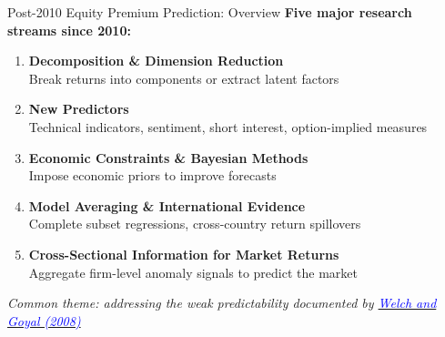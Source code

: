 \documentclass{beamer}
\begin{document}
\begin{frame}{Post-2010 Equity Premium Prediction: Overview}
	\textbf{Five major research streams since 2010:}
	\begin{enumerate}
		\item \textbf{Decomposition \& Dimension Reduction} \\
		      {\small Break returns into components or extract latent factors}
		\item \textbf{New Predictors} \\
		      {\small Technical indicators, sentiment, short interest, option-implied measures}
		\item \textbf{Economic Constraints \& Bayesian Methods} \\
		      {\small Impose economic priors to improve forecasts}
		\item \textbf{Model Averaging \& International Evidence} \\
		      {\small Complete subset regressions, cross-country return spillovers}
		\item \textbf{Cross-Sectional Information for Market Returns} \\
		      {\small Aggregate firm-level anomaly signals to predict the market}
	\end{enumerate}

	\vspace{5pt}
	{\small \textit{Common theme: addressing the weak predictability documented by \href{https://doi.org/10.1093/rfs/hhm014}{\textcolor{blue}{Welch and Goyal (2008)}}}}
\end{frame}
\end{document}
